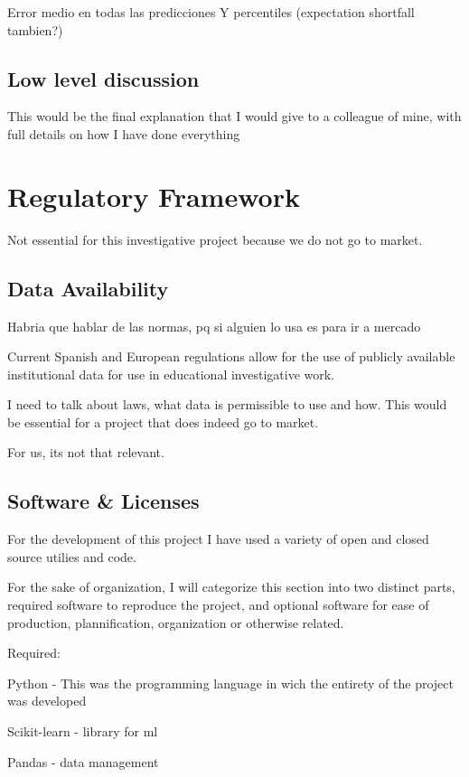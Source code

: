 \documentclass[12pt]{report} %
\begin{document}
Error medio en todas las predicciones
Y percentiles (expectation shortfall tambien?)

\section{Low level discussion} %
This would be the final explanation that I would give to a colleague of mine, with full details on how I have done everything



\chapter{Regulatory Framework}
Not essential for this investigative project because we do not go to market.

\section{Data Availability}
Habria que hablar de las normas, pq si alguien lo usa es para ir a mercado

Current Spanish and European regulations allow for the use of publicly available institutional data for use in educational investigative work.

I need to talk about laws, what data is permissible to use and how. This would be essential for a project that does indeed go to market.

For us, its not that relevant.

\section{Software \& Licenses}

For the development of this project I have used a variety of open and closed source utilies and code.

For the sake of organization, I will categorize this section into two distinct parts, required software to reproduce the project, and optional software for ease of production, plannification, organization or otherwise related.

Required:

Python - This was the programming language in wich the entirety of the project was developed \cite{python}

Scikit-learn - library for ml \cite{scikit-learn}

Pandas - data management \cite{pandas}
\end{document}

